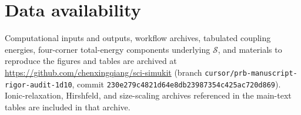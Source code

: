\documentclass[%
 reprint,
 groupedaddress,
 amsmath,amssymb,
 aps,
 prb,
 floatfix,
]{revtex4-2}
\begin{document}
\section*{Data availability}
Computational inputs and outputs, workflow archives, tabulated coupling energies, four-corner total-energy components underlying $\mathcal{S}$, and materials to reproduce the figures and tables are archived at \url{https://github.com/chenxingqiang/sci-simukit} (branch \texttt{cursor/prb-manuscript-rigor-audit-1d10}, commit \texttt{230e279c4821d64e8db23987354c425ac720d869}).
Ionic-relaxation, Hirshfeld, and size-scaling archives referenced in the main-text tables are included in that archive.


\end{document}
